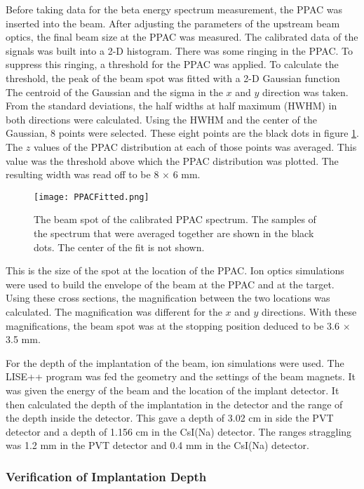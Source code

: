 \documentclass[../MaxHughesThesis.tex]{subfiles}
\begin{document}
Before taking data for the beta energy spectrum measurement, the PPAC was inserted into the beam.
After adjusting the parameters of the upstream beam optics, the final beam size at the PPAC was measured.
The calibrated data of the signals was built into a 2-D histogram.
There was some ringing in the PPAC.
To suppress this ringing, a threshold for the PPAC was applied. 
To calculate the threshold, the peak of the beam spot was fitted with a 2-D Gaussian function
The centroid of the Gaussian and the sigma in the $x$ and $y$ direction was taken. 
From the standard deviations, the half widths at half maximum (HWHM) in both directions were calculated. 
Using the HWHM and the center of the Gaussian, 8 points were selected.
These eight points are the black dots in figure \ref{fig:PPACSpotch}.
The $z$ values of the PPAC distribution at each of those points was averaged.
This value was the threshold above which the PPAC distribution was plotted.  
The resulting width was read off to be 8 $\times$ 6 mm.

\begin{figure}
	\centerline{\texttt{[image: PPACFitted.png]}}
	\caption{The beam spot of the calibrated PPAC spectrum. 
		 The samples of the spectrum that were averaged together are shown in the black dots.
		 The center of the fit is not shown.}
	\label{fig:PPACSpotch}
\end{figure}  

This is the size of the spot at the location of the PPAC. 
Ion optics simulations were used to build the envelope of the beam at the PPAC and at the target.
Using these cross sections, the magnification between the two locations was calculated.
The magnification was different for the $x$ and $y$ directions.
With these magnifications, the beam spot was at the stopping position deduced to be 3.6 $\times$ 3.5 mm.  

For the depth of the implantation of the beam, ion simulations were used. 
The LISE++ program was fed the geometry and the settings of the beam magnets. 
It was given the energy of the beam and the location of the implant detector. 
It then calculated the depth of the implantation in the detector and the range of the depth inside the detector. 
This gave a depth of 3.02 cm in side the PVT detector and a depth of 1.156 cm in the CsI(Na) detector. 
The ranges straggling was 1.2 mm in the PVT detector and 0.4 mm in the CsI(Na) detector.

\subsubsection{Verification of Implantation Depth}
\end{document}

